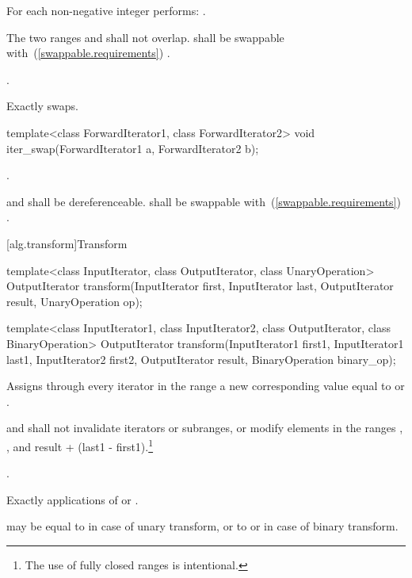 \begin{itemdescr}
\pnum
\effects
For each non-negative integer
performs:
.

\pnum
\requires
The two ranges 
and
shall not overlap.
 shall be swappable with~(\ref{swappable.requirements})
.

\pnum
\returns
{}.

\pnum
\complexity
Exactly
swaps.
\end{itemdescr}

%
\begin{itemdecl}
template<class ForwardIterator1, class ForwardIterator2>
  void iter_swap(ForwardIterator1 a, ForwardIterator2 b);
\end{itemdecl}


\begin{itemdescr}
\pnum
\effects
{}.

\pnum
\requires
{} and  shall be dereferenceable.  shall be
swappable with~(\ref{swappable.requirements}) .
\end{itemdescr}

[alg.transform]{Transform}

%
\begin{itemdecl}
template<class InputIterator, class OutputIterator,
         class UnaryOperation>
  OutputIterator
    transform(InputIterator first, InputIterator last,
              OutputIterator result, UnaryOperation op);

template<class InputIterator1, class InputIterator2,
         class OutputIterator, class BinaryOperation>
  OutputIterator
    transform(InputIterator1 first1, InputIterator1 last1,
              InputIterator2 first2, OutputIterator result,
              BinaryOperation binary_op);
\end{itemdecl}

\begin{itemdescr}
\pnum
\effects
Assigns through every iterator
in the range
a new
corresponding value equal to
or
.

\pnum
\requires
{} and 
shall not invalidate iterators or subranges, or modify elements in the ranges
,
,
and
{result + (last1 - first1)}.\footnote{The use of fully
closed ranges is intentional.}

\pnum
\returns
{}.

\pnum
\complexity
Exactly
applications of
 or .

\pnum
\notes
{} may be equal to 
in case of unary transform,
or to  or 
in case of binary transform.
\end{itemdescr}

